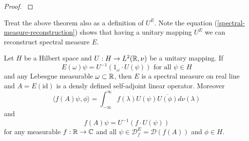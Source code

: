 \documentclass[main.tex]{subfiles}
\begin{document}
\begin{proof}
\cite[see][The Spectral Theorem]{teschl2014}
\end{proof}
Treat the above theorem also as a definition of $U^E$. Note the equation (\ref{spectral-measure-reconstruction}) shows that having a unitary mapping $U^E$ we can reconstruct spectral measure $E$.
\begin{theorem}
Let $H$ be a Hilbert space and $U:H\to L^2(\mathbb{R}, \nu)$ be a unitary mapping. If 
\begin{equation}
E(\omega)\psi = U^{-1}(1_\omega\cdot U(\psi)) \text{ for all } \psi\in H
\end{equation}
and any Lebesgue measurable $\omega\subset\mathbb{R}$, 
then $E$ is a spectral measure on real line and $A = E(\text{id})$ is a densly defined self-adjoint linear operator. Moreover
\begin{equation}
\langle f(A)\psi, \phi \rangle = \int_{-\infty}^{\infty} f(\lambda) U(\psi)\overline{U(\phi)} d\nu(\lambda) 
\end{equation}
and
\begin{equation}
f(A)\psi = U^{-1}(f\cdot U(\psi))
\end{equation}
for any measurable $f:\mathbb{R}\to\mathbb{C}$ and all $\psi\in\mathcal{D}^E_f=\mathcal{D}(f(A))$ and $\phi\in H$.
\end{theorem}
\end{document}
